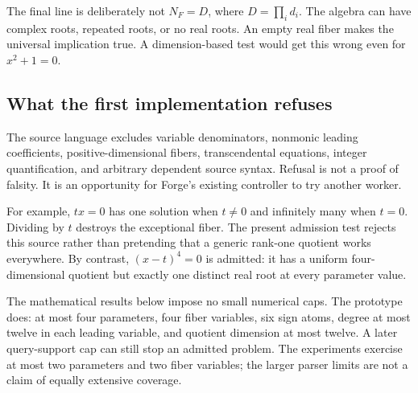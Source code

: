 The final line is deliberately not $N_F=D$, where $D=\prod_i d_i$. The algebra can have complex roots, repeated roots, or no real roots. An empty real fiber makes the universal implication true. A dimension-based test would get this wrong even for $x^2+1=0$.

\subsection{What the first implementation refuses}

The source language excludes variable denominators, nonmonic leading coefficients, positive-dimensional fibers, transcendental equations, integer quantification, and arbitrary dependent source syntax. Refusal is not a proof of falsity. It is an opportunity for Forge's existing controller to try another worker.

For example, $tx=0$ has one solution when $t\ne0$ and infinitely many when $t=0$. Dividing by $t$ destroys the exceptional fiber. The present admission test rejects this source rather than pretending that a generic rank-one quotient works everywhere. By contrast, $(x-t)^4=0$ is admitted: it has a uniform four-dimensional quotient but exactly one distinct real root at every parameter value.

The mathematical results below impose no small numerical caps. The prototype does: at most four parameters, four fiber variables, six sign atoms, degree at most twelve in each leading variable, and quotient dimension at most twelve. A later query-support cap can still stop an admitted problem. The experiments exercise at most two parameters and two fiber variables; the larger parser limits are not a claim of equally extensive coverage.
